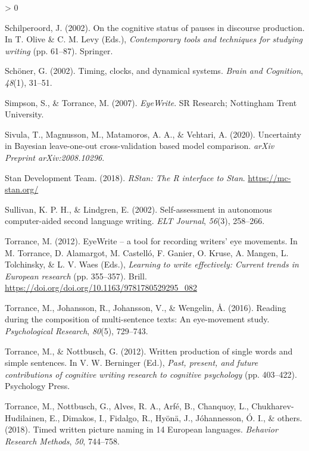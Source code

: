 \documentclass[
  english,
  man,floatsintext]{apa7}
\newlength{\cslhangindent}
\newenvironment{CSLReferences}[2] %
 {%
  \setlength{\parindent}{0pt}
  \ifodd #1 \everypar{\setlength{\hangindent}{\cslhangindent}}\ignorespaces\fi
  \ifnum #2 > 0
  \setlength{\parskip}{#2\baselineskip}
  \fi
 }%
 {}
\begin{document}
\begin{CSLReferences}{1}{0}
\leavevmode\hypertarget{ref-schilperoord2002cognitive}{}%
Schilperoord, J. (2002). On the cognitive status of pauses in discourse production. In T. Olive \& C. M. Levy (Eds.), \emph{Contemporary tools and techniques for studying writing} (pp. 61--87). Springer.

\leavevmode\hypertarget{ref-schoner2002timing}{}%
Schöner, G. (2002). Timing, clocks, and dynamical systems. \emph{Brain and Cognition}, \emph{48}(1), 31--51.

\leavevmode\hypertarget{ref-sim07}{}%
Simpson, S., \& Torrance, M. (2007). \emph{EyeWrite}. SR Research; Nottingham Trent University.

\leavevmode\hypertarget{ref-sivula2020uncertainty}{}%
Sivula, T., Magnusson, M., Matamoros, A. A., \& Vehtari, A. (2020). Uncertainty in {B}ayesian leave-one-out cross-validation based model comparison. \emph{arXiv Preprint arXiv:2008.10296}.

\leavevmode\hypertarget{ref-rstan}{}%
Stan Development Team. (2018). \emph{{RStan}: The {R} interface to {Stan}}. \url{https://mc-stan.org/}

\leavevmode\hypertarget{ref-sullivan2002self}{}%
Sullivan, K. P. H., \& Lindgren, E. (2002). Self-assessment in autonomous computer-aided second language writing. \emph{ELT Journal}, \emph{56}(3), 258--266.

\leavevmode\hypertarget{ref-torrance201203}{}%
Torrance, M. (2012). EyeWrite -- a tool for recording writers' eye movements. In M. Torrance, D. Alamargot, M. Castelló, F. Ganier, O. Kruse, A. Mangen, L. Tolchinsky, \& L. V. Waes (Eds.), \emph{Learning to write effectively: Current trends in {E}uropean research} (pp. 355--357). Brill. \url{https://doi.org/doi.org/10.1163/9781780529295_082}

\leavevmode\hypertarget{ref-torrance2016reading}{}%
Torrance, M., Johansson, R., Johansson, V., \& Wengelin, Å. (2016). Reading during the composition of multi-sentence texts: An eye-movement study. \emph{Psychological Research}, \emph{80}(5), 729--743.

\leavevmode\hypertarget{ref-torrance2012written}{}%
Torrance, M., \& Nottbusch, G. (2012). Written production of single words and simple sentences. In V. W. Berninger (Ed.), \emph{Past, present, and future contributions of cognitive writing research to cognitive psychology} (pp. 403--422). Psychology Press.

\leavevmode\hypertarget{ref-torrance2018timed}{}%
Torrance, M., Nottbusch, G., Alves, R. A., Arfé, B., Chanquoy, L., Chukharev-Hudilainen, E., Dimakos, I., Fidalgo, R., Hyönä, J., Jóhannesson, Ó. I., \& others. (2018). Timed written picture naming in 14 {E}uropean languages. \emph{Behavior Research Methods}, \emph{50}, 744--758.


\end{CSLReferences}
\end{document}
